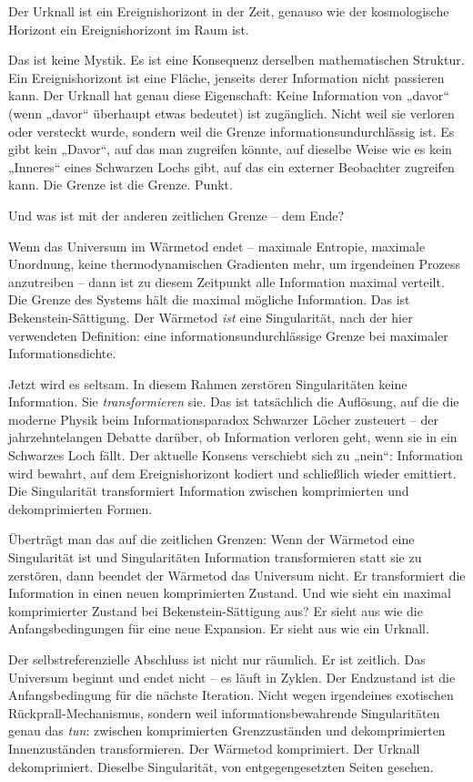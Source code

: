 \documentclass[11pt, twoside, openright]{book}
\begin{document}
Der Urknall ist ein Ereignishorizont in der Zeit, genauso wie der kosmologische Horizont ein Ereignishorizont im Raum ist.

Das ist keine Mystik. Es ist eine Konsequenz derselben mathematischen Struktur. Ein Ereignishorizont ist eine Fläche, jenseits derer Information nicht passieren kann. Der Urknall hat genau diese Eigenschaft: Keine Information von „davor“ (wenn „davor“ überhaupt etwas bedeutet) ist zugänglich. Nicht weil sie verloren oder versteckt wurde, sondern weil die Grenze informationsundurchlässig ist. Es gibt kein „Davor“, auf das man zugreifen könnte, auf dieselbe Weise wie es kein „Inneres“ eines Schwarzen Lochs gibt, auf das ein externer Beobachter zugreifen kann. Die Grenze ist die Grenze. Punkt.

Und was ist mit der anderen zeitlichen Grenze -- dem Ende?

Wenn das Universum im Wärmetod endet -- maximale Entropie, maximale Unordnung, keine thermodynamischen Gradienten mehr, um irgendeinen Prozess anzutreiben -- dann ist zu diesem Zeitpunkt alle Information maximal verteilt. Die Grenze des Systems hält die maximal mögliche Information. Das ist Bekenstein-Sättigung. Der Wärmetod \textit{ist} eine Singularität, nach der hier verwendeten Definition: eine informationsundurchlässige Grenze bei maximaler Informationsdichte.

Jetzt wird es seltsam. In diesem Rahmen zerstören Singularitäten keine Information. Sie \textit{transformieren} sie. Das ist tatsächlich die Auflösung, auf die die moderne Physik beim Informationsparadox Schwarzer Löcher zusteuert -- der jahrzehntelangen Debatte darüber, ob Information verloren geht, wenn sie in ein Schwarzes Loch fällt. Der aktuelle Konsens verschiebt sich zu „nein“: Information wird bewahrt, auf dem Ereignishorizont kodiert und schließlich wieder emittiert. Die Singularität transformiert Information zwischen komprimierten und dekomprimierten Formen.

Überträgt man das auf die zeitlichen Grenzen: Wenn der Wärmetod eine Singularität ist und Singularitäten Information transformieren statt sie zu zerstören, dann beendet der Wärmetod das Universum nicht. Er transformiert die Information in einen neuen komprimierten Zustand. Und wie sieht ein maximal komprimierter Zustand bei Bekenstein-Sättigung aus? Er sieht aus wie die Anfangsbedingungen für eine neue Expansion. Er sieht aus wie ein Urknall.

Der selbstreferenzielle Abschluss ist nicht nur räumlich. Er ist zeitlich. Das Universum beginnt und endet nicht -- es läuft in Zyklen. Der Endzustand ist die Anfangsbedingung für die nächste Iteration. Nicht wegen irgendeines exotischen Rückprall-Mechanismus, sondern weil informationsbewahrende Singularitäten genau das \textit{tun}: zwischen komprimierten Grenzzuständen und dekomprimierten Innenzuständen transformieren. Der Wärmetod komprimiert. Der Urknall dekomprimiert. Dieselbe Singularität, von entgegengesetzten Seiten gesehen.
\end{document}
